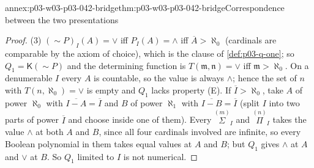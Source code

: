\begin{annexitem}{annex:p03-w03-p03-042-bridge}{thm:p03-w03-p03-042-bridge}{Correspondence between the two presentations}
\begin{proof}
(3) \(({\sim}P)_I(A)=\vee\) iff \(P_I(A)=\wedge\) iff \(\overline A>
\aleph_0\) (cardinals are comparable by the axiom of choice), which is
the clause of \cref{def:p03-q-one}; so \(Q_1=\mathsf K({\sim}P)\) and the
determining function is \(T(\mathfrak m,\mathfrak n)=\vee\) iff
\(\mathfrak m>\aleph_0\).  On a denumerable \(I\) every \(A\) is
countable, so the value is always \(\wedge\); hence the set of \(n\) with
\(T(n,\aleph_0)=\vee\) is empty and \(Q_1\) lacks property (E).  If
\(\overline I>\aleph_0\), take \(A\) of power \(\aleph_0\) with
\(\overline{I-A}=\overline I\) and \(B\) of power \(\aleph_1\) with
\(\overline{I-B}=\overline I\) (split \(I\) into two parts of power
\(\overline I\) and choose inside one of them).  Every
\(\overset{(m)}\Sigma_I\) and \(\overset{(n)}\Pi_I\) takes the value
\(\wedge\) at both \(A\) and \(B\), since all four cardinals involved are
infinite, so every Boolean polynomial in them takes equal values at \(A\)
and \(B\); but \(Q_1\) gives \(\wedge\) at \(A\) and \(\vee\) at \(B\).
So \(Q_1\) limited to \(I\) is not numerical.
\end{proof}
\end{annexitem}

